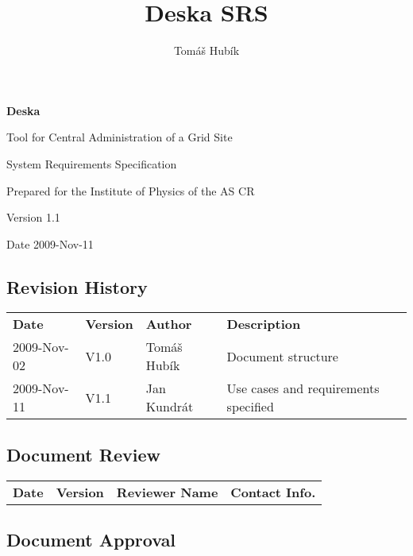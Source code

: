 \documentclass[12pt]{article}
\author{Tomáš Hubík}
\title{Deska SRS}
\begin{document}
{\Huge \textbf{Deska}}

\vspace{0.2in}

{\large Tool for Central Administration of a Grid Site}

\vspace{0.5in}

{\large System Requirements Specification}

\vspace{0.2in}

{\large Prepared for the Institute of Physics of the AS CR}

\vspace{0.2in}

{\large Version 1.1}

\vspace{0.2in}

{\large Date 2009-Nov-11}

\vspace{0.5in}

\subsection*{Revision History}

\begin{table}[!h]
	\begin{tabular}{l l l l}
		\textbf{Date} & \textbf{Version} & \textbf{Author} & \textbf{Description} \\
		2009-Nov-02 & V1.0 & Tomáš Hubík & Document structure \\
		2009-Nov-11 & V1.1 & Jan Kundrát & Use cases and requirements specified \\
	\end{tabular}
	\label{tab:RevisionHistory}
\end{table}


\subsection*{Document Review}

\begin{table}[!h]
	\begin{tabular}{l l l l}
		\textbf{Date} & \textbf{Version} & \textbf{Reviewer Name} & \textbf{Contact Info.} \\
	\end{tabular}
	\label{tab:DocumentReview}
\end{table}


\subsection*{Document Approval}
\end{document}
